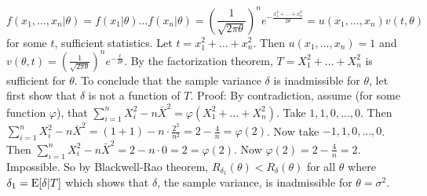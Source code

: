 \documentclass[12pt]{article}
\begin{document}
$$f(x_1,\dots,x_n|\theta) = f(x_1|\theta) \dots f(x_n|\theta) = (\frac{1}{\sqrt{2\pi \theta}})^n e^{- \frac{x_1^2 + \dots + x_n^2}{2\theta}} = u(x_1,\dots,x_n)v(t,\theta)$$ 
for some $t$, sufficient statistics. Let $t = x_1^2 + \dots + x_n^2$. Then $u(x_1,\dots,x_n) = 1$ and $v(\theta,t) = (\frac{1}{\sqrt{2\pi \theta}})^n e^{-\frac{t}{2\theta}}$. By the factorization theorem, $T = X_1^2 + \dots + X_n^2$ is sufficient for $\theta$. To conclude that the sample variance $\delta$ is inadmissible for $\theta$, let first show that $\delta$ is not a function of $T$. Proof: By contradiction, assume (for some function $\varphi$), that $\sum_{i=1}^n X_i^2 - n\bar{X}^2 = \varphi(X_1^2 + \dots + X_n^2)$. Take $1,1,0, \dots, 0$. Then $\sum_{i=1}^n X_i^2 - n\bar{X}^2 = (1 + 1) - n \cdot \frac{2^2}{n^2} = 2 - \frac{4}{n} = \varphi(2)$. Now take $-1,1,0,\dots,0$. Then $\sum_{i=1}^n X_i^2 - n\bar{X}^2 = 2 - n \cdot 0 = 2 = \varphi(2)$. Now $\varphi(2) = 2 - \frac{4}{n} = 2$. Impossible. So by Blackwell-Rao theorem, $R_{\delta_1}(\theta) < R_{\delta}(\theta)$ for all $\theta$ where $\delta_1 = \mathrm{E}[ \delta | T ]$ which shows that $\delta$, the sample variance, is inadmissible for $\theta = \sigma^2$. \\~\\
\end{document}
